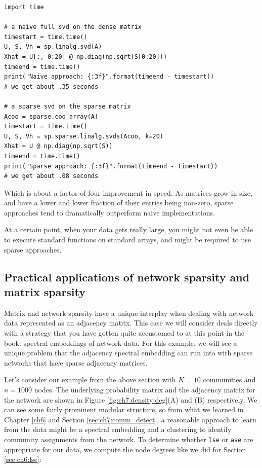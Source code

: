 \begin{lstlisting}[style=python]
import time

# a naive full svd on the dense matrix
timestart = time.time()
U, S, Vh = sp.linalg.svd(A)
Xhat = U[:, 0:20] @ np.diag(np.sqrt(S[0:20]))
timeend = time.time()
print("Naive approach: {:3f}".format(timeend - timestart))
# we get about .35 seconds

# a sparse svd on the sparse matrix
Acoo = sparse.coo_array(A)
timestart = time.time()
U, S, Vh = sp.sparse.linalg.svds(Acoo, k=20)
Xhat = U @ np.diag(np.sqrt(S))
timeend = time.time()
print("Sparse approach: {:3f}".format(timeend - timestart))
# we get about .08 seconds
\end{lstlisting}

Which is about a factor of four improvement in speed. As matrices grow in size, and have a lower and lower fraction of their entries being non-zero, sparse approaches tend to dramatically outperform naive implementations. 

At a certain point, when your data gets really large, you might not even be able to execute standard functions on standard arrays, and might be required to use sparse approaches.

\subsection{Practical applications of network sparsity and matrix sparsity}

Matrix and network sparsity have a unique interplay when dealing with network data represented as an adjacency matrix. This case we will consider deals directly with a strategy that you have gotten quite accustomed to at this point in the book: spectral embeddings of network data. For this example, we will see a unique problem that the adjacency spectral embedding can run into with sparse networks that have sparse adjacency matrices.

Let's consider our example from the above section with $K=10$ communities and $n=1000$ nodes. The underlying probability matrix and the adjacency matrix for the network are shown in Figure \ref{fig:ch7:density:deg}(A) and (B) respectively. We can see some fairly prominent modular structure, so from what we learned in Chapter \ref{ch6} and Section \ref{sec:ch7:comm_detect}, a reasonable approach to learn from the data might be a spectral embedding and a clustering to identify community assignments from the network. To determine whether \texttt{lse} or \texttt{ase} are appropriate for our data, we compute the node degrees like we did for Section \ref{sec:ch6:lse}:

